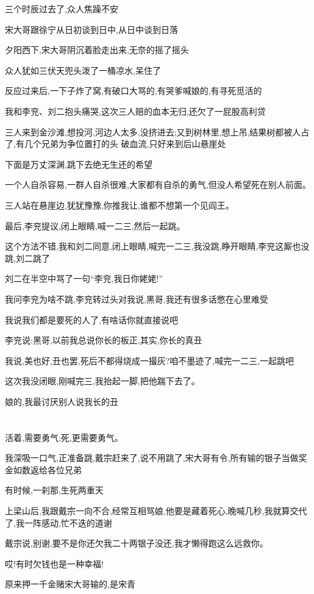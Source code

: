 ﻿\documentclass[12pt]{article}
\begin{document}
三个时辰过去了,众人焦躁不安\dldots

宋大哥跟徐宁从日初谈到日中,从日中谈到日落

夕阳西下,宋大哥阴沉着脸走出来,无奈的摇了摇头

众人犹如三伏天兜头泼了一桶凉水,呆住了

反应过来后,一下子炸了窝,有破口大骂的,有哭爹喊娘的,有寻死觅活的\dldots

我和李兖、刘二抱头痛哭,这次三人赔的血本无归,还欠了一屁股高利贷

三人来到金沙滩,想投河,河边人太多,没挤进去;又到树林里,想上吊,结果树都被人占了,有几个兄弟为争位置打的头
破血流,只好来到后山悬崖处

下面是万丈深渊,跳下去绝无生还的希望

一个人自杀容易,一群人自杀很难,大家都有自杀的勇气,但没人希望死在别人前面。

三人站在悬崖边,犹犹豫豫,你推我让,谁都不想第一个见阎王。

最后,李兖提议,闭上眼睛,喊一二三,然后一起跳。

这个方法不错,我和刘二同意,闭上眼睛,喊完一二三,我没跳,睁开眼睛,李兖这厮也没跳,刘二跳了

刘二在半空中骂了一句``李兖,我日你姥姥!''

我问李兖为啥不跳,李兖转过头对我说,黑哥,我还有很多话憋在心里难受

我说我们都是要死的人了,有啥话你就直接说吧

李兖说:黑哥,以前我总说你长的板正,其实,你长的真丑

我说,美也好,丑也罢,死后不都得烧成一撮灰?咱不墨迹了,喊完一二三,一起跳吧

这次我没闭眼,刚喊完三,我抬起一脚,把他踹下去了。

娘的,我最讨厌别人说我长的丑
\section{}

活着,需要勇气;死,更需要勇气。

我深吸一口气,正准备跳,戴宗赶来了,说不用跳了,宋大哥有令,所有输的银子当做奖金如数返给各位兄弟

有时候,一刹那,生死两重天

上梁山后,我跟戴宗一向不合,经常互相骂娘,他要是藏着死心,晚喊几秒,我就算交代了,我一阵感动,忙不迭的道谢

戴宗说,别谢,要不是你还欠我二十两银子没还,我才懒得跑这么远救你。

哎!有时欠钱也是一种幸福!

原来押一千金赌宋大哥输的,是宋青
\end{document}

